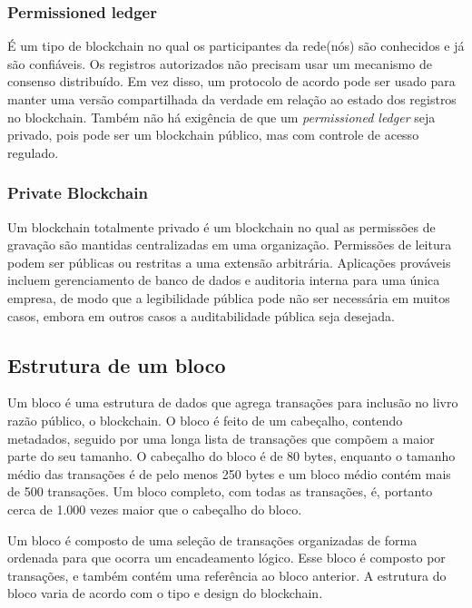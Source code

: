     \subsubsection{Permissioned ledger}
    
    É um tipo de blockchain no qual os participantes da rede(nós) são conhecidos e já são confiáveis. Os registros autorizados não precisam usar um mecanismo de consenso distribuído. Em vez disso, um protocolo de acordo pode ser usado para manter uma versão compartilhada da verdade em relação ao estado dos registros no blockchain. Também não há exigência de que um \textit{permissioned ledger} seja privado, pois pode ser um blockchain público, mas com controle de acesso regulado.\cite{mastering_blockchain}

    \subsubsection{Private Blockchain}

    Um blockchain totalmente privado é um blockchain no qual as permissões de gravação são mantidas centralizadas em uma organização. Permissões de leitura podem ser públicas ou restritas a uma extensão arbitrária. Aplicações prováveis incluem gerenciamento de banco de dados e auditoria interna para uma única empresa, de modo que a legibilidade pública pode não ser necessária em muitos casos, embora em outros casos a auditabilidade pública seja desejada.\cite{blockchain_pratical_guide}



    \subsection{Estrutura de um bloco}

        Um bloco é uma estrutura de dados que agrega transações para inclusão no livro razão público, o blockchain. O bloco é feito de um cabeçalho, contendo metadados, seguido por uma longa lista de transações que compõem a maior parte do seu tamanho. O cabeçalho do bloco é de 80 bytes, enquanto o tamanho médio das transações é de pelo menos 250 bytes e um bloco médio contém mais de 500 transações. Um bloco completo, com todas as transações, é, portanto cerca de 1.000 vezes maior que o cabeçalho do bloco.\cite{mastering_blockchain_andreas}

        Um bloco é composto de uma seleção de transações organizadas de forma ordenada para que ocorra um encadeamento lógico. Esse bloco é composto por transações, e também contém uma referência ao bloco anterior. A estrutura do bloco varia de acordo com o tipo e design do blockchain.\cite{mastering_blockchain}
        
